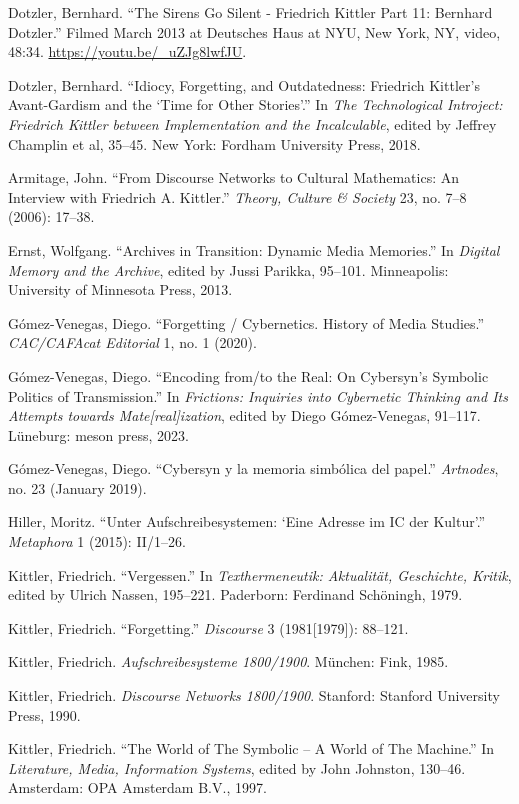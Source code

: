 \documentclass{tufte-handout}
\begin{document}
\begin{hangparas}{.25in}{1} 



Dotzler, Bernhard. ``The Sirens Go Silent - Friedrich Kittler Part 11:
Bernhard Dotzler.'' Filmed March 2013 at Deutsches Haus at NYU, New
York, NY, video, 48:34. \url{https://youtu.be/_uZJg8lwfJU}.

Dotzler, Bernhard. ``Idiocy, Forgetting, and Outdatedness: Friedrich
Kittler's Avant-Gardism and the `Time for Other Stories'.'' In \emph{The
Technological Introject: Friedrich Kittler between Implementation and
the Incalculable}, edited by Jeffrey Champlin et al, 35--45. New York:
Fordham University Press, 2018.

Armitage, John. ``From Discourse Networks to Cultural Mathematics: An
Interview with Friedrich A. Kittler.'' \emph{Theory, Culture \& Society}
23, no. 7--8 (2006): 17--38.

Ernst, Wolfgang. ``Archives in Transition: Dynamic Media Memories.'' In
\emph{Digital Memory and the Archive}, edited by Jussi Parikka, 95--101.
Minneapolis: University of Minnesota Press, 2013.

Gómez-Venegas, Diego. ``Forgetting / Cybernetics. History of Media
Studies.'' \emph{CAC/CAFAcat Editorial} 1, no. 1 (2020).

Gómez-Venegas, Diego. ``Encoding from/to the Real: On Cybersyn's
Symbolic Politics of Transmission.'' In \emph{Frictions: Inquiries into
Cybernetic Thinking and Its Attempts towards Mate{[}real{]}ization},
edited by Diego Gómez-Venegas, 91--117. Lüneburg: meson press, 2023.

Gómez-Venegas, Diego. ``Cybersyn y la memoria simbólica del papel.''
\emph{Artnodes}, no. 23 (January 2019).

Hiller, Moritz. ``Unter Aufschreibesystemen: `Eine Adresse im IC der
Kultur'.'' \emph{Metaphora} 1 (2015): II/1--26.

Kittler, Friedrich. ``Vergessen.'' In \emph{Texthermeneutik: Aktualität,
Geschichte, Kritik}, edited by Ulrich Nassen, 195--221. Paderborn:
Ferdinand Schöningh, 1979.

Kittler, Friedrich. ``Forgetting.'' \emph{Discourse} 3 (1981{[}1979{]}):
88--121.

Kittler, Friedrich. \emph{Aufschreibesysteme 1800/1900}. München: Fink,
1985.

Kittler, Friedrich. \emph{Discourse Networks 1800/1900}. Stanford:
Stanford University Press, 1990.

Kittler, Friedrich. ``The World of The Symbolic -- A World of The
Machine.'' In \emph{Literature, Media, Information Systems}, edited by
John Johnston, 130--46. Amsterdam: OPA Amsterdam B.V., 1997.


\end{hangparas}
\end{document}
